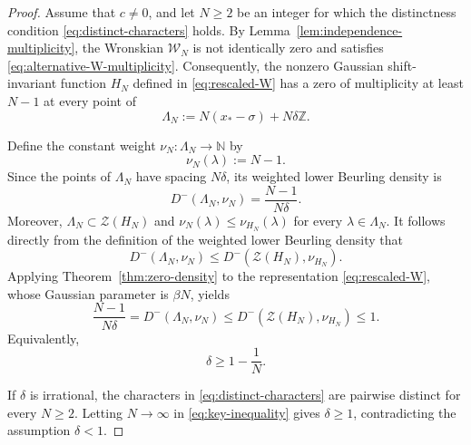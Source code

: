\documentclass[11pt]{amsart}
\numberwithin{equation}{section}
\theoremstyle{definition}
\theoremstyle{remark}
\newcommand{\Z}{\mathbb Z}
\newcommand{\N}{\mathbb N}
\newcommand{\cW}{\mathcal W}
\newcommand{\cZ}{\mathcal Z}
\begin{document}
\begin{proof}
    Assume that $c\neq0$, and let $N\geq2$ be an integer for which the distinctness condition \eqref{eq:distinct-characters} holds. By Lemma~\ref{lem:independence-multiplicity}, the Wronskian $\cW_N$ is not identically zero and satisfies \eqref{eq:alternative-W-multiplicity}. Consequently, the nonzero Gaussian shift-invariant function $H_N$ defined in \eqref{eq:rescaled-W} has a zero of multiplicity at least $N-1$ at every point of
    \begin{equation}\label{eq:rescaled-zero-lattice}
        \Lambda_N
        :=
        N(x_*-\sigma)+N\delta\Z.
    \end{equation}
    
    Define the constant weight $\nu_N\colon\Lambda_N\to\N$ by
    \begin{equation}
        \nu_N(\lambda):=N-1.
    \end{equation}
    Since the points of $\Lambda_N$ have spacing $N\delta$, its weighted lower Beurling density is
    \begin{equation}\label{eq:rescaled-zero-density}
        D^-(\Lambda_N,\nu_N)
        =
        \frac{N-1}{N\delta}.
    \end{equation}
    Moreover, $\Lambda_N\subset\cZ(H_N)$ and $\nu_N(\lambda)\leq\nu_{H_N}(\lambda)$ for every $\lambda\in\Lambda_N$. It follows directly from the definition of the weighted lower Beurling density that
    \begin{equation}
        D^-(\Lambda_N,\nu_N)
        \leq
        D^-(\cZ(H_N),\nu_{H_N}).
    \end{equation}
    Applying Theorem~\ref{thm:zero-density} to the representation \eqref{eq:rescaled-W}, whose Gaussian parameter is $\beta N$, yields
    \begin{equation}\label{eq:key-inequality}
        \frac{N-1}{N\delta}
        =
        D^-(\Lambda_N,\nu_N)
        \leq
        D^-(\cZ(H_N),\nu_{H_N})
        \leq1.
    \end{equation}
    Equivalently,
    \begin{equation}
        \delta\geq1-\frac1N.
    \end{equation}
    
    If $\delta$ is irrational, the characters in \eqref{eq:distinct-characters} are pairwise distinct for every $N\geq2$. Letting $N\to\infty$ in \eqref{eq:key-inequality} gives $\delta\geq1$, contradicting the assumption $\delta<1$.
    

\end{proof}
\end{document}
